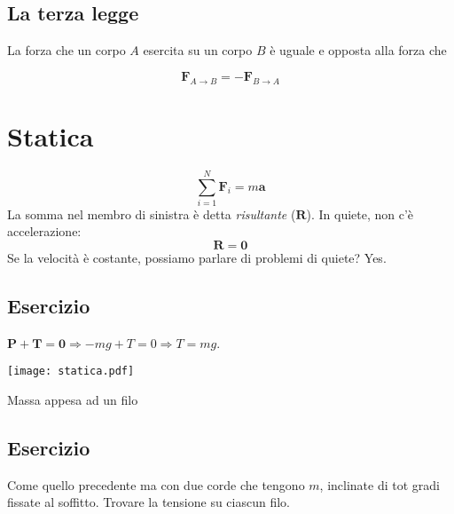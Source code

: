 \subsection{La terza legge}
\vspace{8pt}
\begin{tcolorbox}[colback = red!30, colframe = red!30!black, title = {Terza legge della dinamica (legge di azione e reazione)}]
La forza che un corpo $A$ esercita su un corpo $B$ è uguale e opposta alla forza
che

\[ \mathbf{F}_{A\to B} = -\mathbf{F}_{B\to A} \]
\end{tcolorbox}
\vspace{5pt}


\section{Statica}
\[ \sum_{i = 1}^{N}\mathbf{F}_i = m\mathbf{a} \]
La somma nel membro di sinistra è detta \textit{risultante} ($\mathbf{R}$).
In quiete, non c'è accelerazione:
\[ \mathbf{R} = \mathbf{0} \]
Se la velocità è costante, possiamo parlare di problemi di quiete? Yes.

\subsection*{Esercizio}
$\mathbf{P} + \mathbf{T} = \mathbf{0} \Rightarrow -mg + T = 0 \Rightarrow T = mg$.

\begin{marginfigure}
    \centering
    \texttt{[image: statica.pdf]}
    \caption{Massa appesa ad un filo}
    \label{filo}
\end{marginfigure}

\subsection*{Esercizio}
Come quello precedente ma con due corde che tengono $m$, inclinate di
tot gradi fissate al soffitto. Trovare la tensione su ciascun filo.





